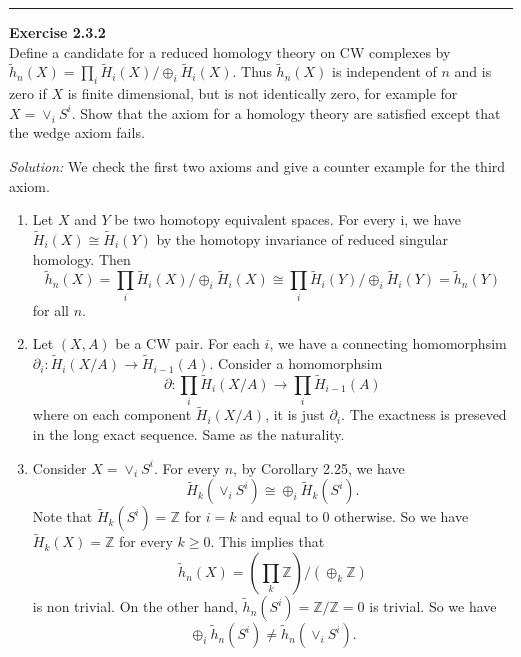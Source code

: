 \documentclass[a4paper, 12pt]{article}
\newenvironment{problem}[2][Exercise]
    { \begin{mdframed}[backgroundcolor=gray!20] \textbf{#1 #2} \\}
    {  \end{mdframed}}
\newenvironment{solution}
    {\textit{Solution:}}
    {}
\begin{document}
\noindent\rule{7in}{2.8pt}
\begin{problem}{2.3.2}
Define a candidate for a reduced homology theory on CW complexes by \(\tilde{h}_n(X)=\prod_i \tilde{H}_i(X)/\oplus_i \tilde{H}_i(X)\). Thus \(\tilde{h}_n(X)\) is independent of \(n\) and is zero if \(X\) is finite 
dimensional, but is not identically zero, for example for \(X=\vee_iS^i\). Show that the axiom for a homology theory are satisfied except that the wedge axiom fails.
\end{problem}
\begin{solution}
We check the first two axioms and give a counter example for the third axiom.
\begin{enumerate}[(1)]
\item Let \(X\) and \(Y\) be two homotopy equivalent spaces. For every i, we have \(\tilde{H}_i(X)\cong \tilde{H}_i(Y)\) by the homotopy invariance of reduced singular homology. Then 
\[\tilde{h}_n(X)=\prod_i \tilde{H}_i(X)/\oplus_i \tilde{H}_i(X)\cong \prod_i \tilde{H}_i(Y)/\oplus_i \tilde{H}_i(Y)=\tilde{h}_n(Y)\]
for all \(n\).
\item Let \((X,A)\) be a CW pair. For each \(i\), we have a connecting homomorphsim \(\partial_i:\tilde{H}_i(X/A)\rightarrow \tilde{H}_{i-1}(A)\). Consider a homomorphsim 
\[\partial:\prod_i \tilde{H}_i(X/A)\rightarrow \prod_i \tilde{H}_{i-1}(A)\]
where on each component \(\tilde{H}_i(X/A)\), it is just \(\partial_i\). The exactness is preseved in the long exact sequence. Same as the naturality.
\item Consider \(X=\vee_i S^i\). For every \(n\), by Corollary 2.25, we have 
\[\tilde{H}_k(\vee_i S^i)\cong \oplus_i \tilde{H}_k(S^i).\]
Note that \(\tilde{H}_k(S^i)=\mathbb{Z}\) for \(i=k\) and equal to \(0\) otherwise. So we have \(\tilde{H}_k(X)=\mathbb{Z}\) for every \(k\geq 0\). This implies that 
\[\tilde{h}_n(X)=(\prod_k \mathbb{Z})/(\oplus_k \mathbb{Z})\]
is non trivial. On the other hand, \(\tilde{h}_n(S^i)=\mathbb{Z}/\mathbb{Z}=0\) is trivial. So we have 
\[\oplus_i \tilde{h}_n(S^i)\neq \tilde{h}_n(\vee_i S^i).\]
\end{enumerate}
\end{solution}
\end{document}

